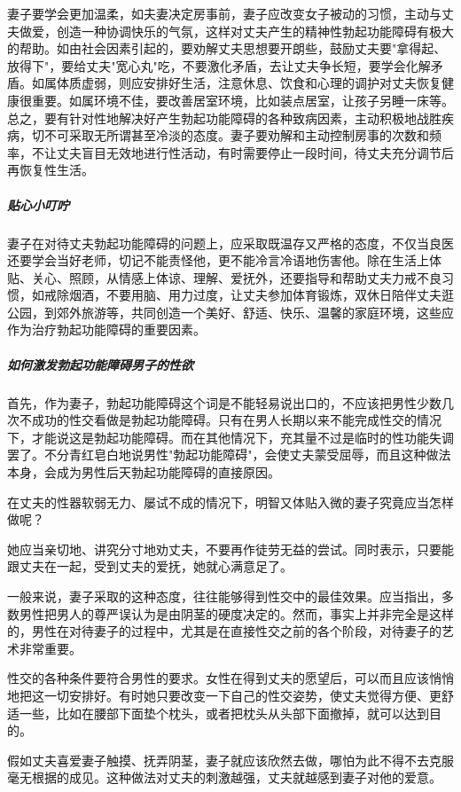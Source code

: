 妻子要学会更加温柔，如夫妻决定房事前，妻子应改变女子被动的习惯，主动与丈夫做爱，创造一种协调快乐的气氛，这样对丈夫产生的精神性勃起功能障碍有极大的帮助。如由社会因素引起的，要劝解丈夫思想要开朗些，鼓励丈夫要"拿得起、放得下"，要给丈夫"宽心丸"吃，不要激化矛盾，去让丈夫争长短，要学会化解矛盾。如属体质虚弱，则应安排好生活，注意休息、饮食和心理的调护对丈夫恢复健康很重要。如属环境不佳，要改善居室环境，比如装点居室，让孩子另睡一床等。总之，要有针对性地解决好产生勃起功能障碍的各种致病因素，主动积极地战胜疾病，切不可采取无所谓甚至冷淡的态度。妻子要劝解和主动控制房事的次数和频率，不让丈夫盲目无效地进行性活动，有时需要停止一段时间，待丈夫充分调节后再恢复性生活。

\subparagraph{贴心小叮咛}

妻子在对待丈夫勃起功能障碍的问题上，应采取既温存又严格的态度，不仅当良医还要学会当好老师，切记不能责怪他，更不能冷言冷语地伤害他。除在生活上体贴、关心、照顾，从情感上体谅、理解、爱抚外，还要指导和帮助丈夫力戒不良习惯，如戒除烟酒，不要用脑、用力过度，让丈夫参加体育锻炼，双休日陪伴丈夫逛公园，到郊外旅游等，共同创造一个美好、舒适、快乐、温馨的家庭环境，这些应作为治疗勃起功能障碍的重要因素。

\subparagraph{如何激发勃起功能障碍男子的性欲}

首先，作为妻子，勃起功能障碍这个词是不能轻易说出口的，不应该把男性少数几次不成功的性交看做是勃起功能障碍。只有在男人长期以来不能完成性交的情况下，才能说这是勃起功能障碍。而在其他情况下，充其量不过是临时的性功能失调罢了。不分青红皂白地说男性"勃起功能障碍"，会使丈夫蒙受屈辱，而且这种做法本身，会成为男性后天勃起功能障碍的直接原因。

在丈夫的性器软弱无力、屡试不成的情况下，明智又体贴入微的妻子究竟应当怎样做呢？

她应当亲切地、讲究分寸地劝丈夫，不要再作徒劳无益的尝试。同时表示，只要能跟丈夫在一起，受到丈夫的爱抚，她就心满意足了。

一般来说，妻子采取的这种态度，往往能够得到性交中的最佳效果。应当指出，多数男性把男人的尊严误认为是由阴茎的硬度决定的。然而，事实上并非完全是这样的，男性在对待妻子的过程中，尤其是在直接性交之前的各个阶段，对待妻子的艺术非常重要。

性交的各种条件要符合男性的要求。女性在得到丈夫的愿望后，可以而且应该悄悄地把这一切安排好。有时她只要改变一下自己的性交姿势，使丈夫觉得方便、更舒适一些，比如在腰部下面垫个枕头，或者把枕头从头部下面撤掉，就可以达到目的。

假如丈夫喜爱妻子触摸、抚弄阴茎，妻子就应该欣然去做，哪怕为此不得不去克服毫无根据的成见。这种做法对丈夫的刺激越强，丈夫就越感到妻子对他的爱意。

